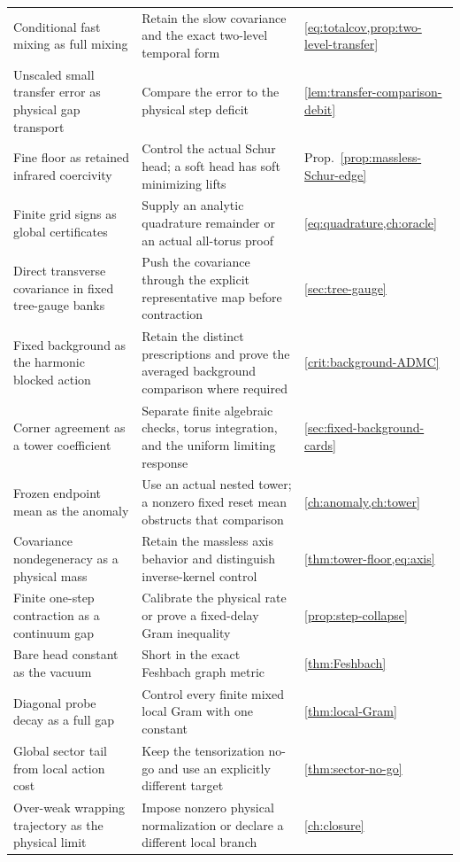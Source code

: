 \documentclass[11pt,oneside,openany]{book}
\theoremstyle{definition}
\theoremstyle{remark}
\begin{document}
\begin{longtable}{L{0.24\textwidth}L{0.49\textwidth}L{0.17\textwidth}}
Conditional fast mixing as full mixing & Retain the slow covariance and the exact two-level temporal form & \cref{eq:totalcov,prop:two-level-transfer} \\
Unscaled small transfer error as physical gap transport & Compare the error to the physical step deficit & \cref{lem:transfer-comparison-debit} \\
Fine floor as retained infrared coercivity & Control the actual Schur head; a soft head has soft minimizing lifts & Prop.~\ref{prop:massless-Schur-edge} \\
Finite grid signs as global certificates & Supply an analytic quadrature remainder or an actual all-torus proof & \cref{eq:quadrature,ch:oracle} \\
Direct transverse covariance in fixed tree-gauge banks & Push the covariance through the explicit representative map before contraction & \cref{sec:tree-gauge} \\
Fixed background as the harmonic blocked action & Retain the distinct prescriptions and prove the averaged background comparison where required & \cref{crit:background-ADMC} \\
Corner agreement as a tower coefficient & Separate finite algebraic checks, torus integration, and the uniform limiting response & \cref{sec:fixed-background-cards} \\
Frozen endpoint mean as the anomaly & Use an actual nested tower; a nonzero fixed reset mean obstructs that comparison & \cref{ch:anomaly,ch:tower} \\
Covariance nondegeneracy as a physical mass & Retain the massless axis behavior and distinguish inverse-kernel control & \cref{thm:tower-floor,eq:axis} \\
Finite one-step contraction as a continuum gap & Calibrate the physical rate or prove a fixed-delay Gram inequality & \cref{prop:step-collapse} \\
Bare head constant as the vacuum & Short in the exact Feshbach graph metric & \cref{thm:Feshbach} \\
Diagonal probe decay as a full gap & Control every finite mixed local Gram with one constant & \cref{thm:local-Gram} \\
Global sector tail from local action cost & Keep the tensorization no-go and use an explicitly different target & \cref{thm:sector-no-go} \\
Over-weak wrapping trajectory as the physical limit & Impose nonzero physical normalization or declare a different local branch & \cref{ch:closure} \\

\end{longtable}
\end{document}
